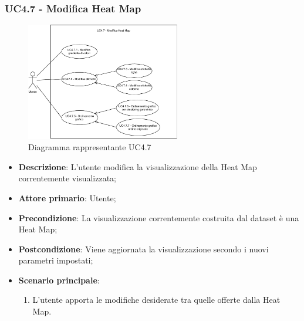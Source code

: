 \newpage
\subsubsection{UC4.7 - Modifica Heat Map}
\label{ssub:uc4.7}
\begin{figure}[h]
    \centering
    \includegraphics[width=0.6\textwidth]{componenti/casi-duso/diagrammi/UC4_7.pdf}
    \caption{Diagramma rappresentante UC4.7}
    \label{fig:UC4.7}
\end{figure}


\begin{itemize}
    \item \textbf{Descrizione}: L’utente modifica la visualizzazione della Heat Map correntemente visualizzata;

    \item \textbf{Attore primario}: Utente;

    \item \textbf{Precondizione}:   La visualizzazione correntemente costruita dal dataset è una Heat Map;

    \item \textbf{Postcondizione}:  Viene aggiornata la visualizzazione secondo i nuovi parametri impostati;

	\item \textbf{Scenario principale}:
		\begin{enumerate}
            \item L'utente apporta le modifiche desiderate tra quelle offerte dalla Heat Map.
        \end{enumerate}
\end{itemize}

